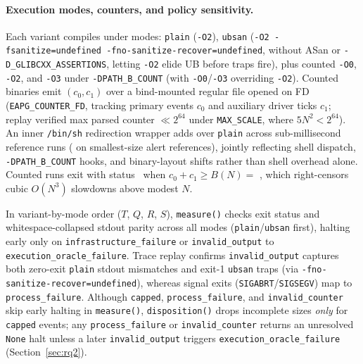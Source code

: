 \documentclass[11pt]{article}
\begin{document}
\paragraph{Execution modes, counters, and policy sensitivity.}
Each variant compiles under \BenchNumModes{} modes: \texttt{plain} (\texttt{-O2}), \texttt{ubsan} (\texttt{-O2 -fsanitize=undefined -fno-sanitize-recover=undefined}, without ASan or \texttt{-D\_GLIBCXX\_ASSERTIONS}, letting \texttt{-O2} elide UB before traps fire), plus counted \texttt{-O0}, \texttt{-O2}, and \texttt{-O3} under \texttt{-DPATH\_B\_COUNT} (with \texttt{-O0}/\texttt{-O3} overriding \texttt{-O2}).
Counted binaries emit $(c_0, c_1)$ over a bind-mounted regular file opened on FD~\BenchFDWire{} (\texttt{EAPG\_COUNTER\_FD}, tracking primary events $c_0$ and auxiliary driver ticks $c_1$; replay verified max parsed counter \BenchMaxCounterVal{} $\ll 2^{64}$ under \texttt{MAX\_SCALE}, where $5N^2 < 2^{64}$).
An inner \texttt{/bin/sh} redirection wrapper adds \BenchFDWrapOverheadMs{} over \texttt{plain} across sub-millisecond reference runs (\BenchOtwoMinusPlainSZeroMs{} on smallest-size alert references), jointly reflecting shell dispatch, \texttt{-DPATH\_B\_COUNT} hooks, and binary-layout shifts rather than shell overhead alone.
Counted runs exit with status~\BenchTickExitCode{} when $c_0+c_1 \ge B(N) =$ \BenchTickCeiling{}, which right-censors cubic $O(N^3)$ slowdowns above modest $N$.

In variant-by-mode order ($T$, $Q$, $R$, $S$), \texttt{measure()} checks exit status and whitespace-collapsed stdout parity across all \BenchNumModes{} modes (\texttt{plain}/\texttt{ubsan} first), halting early only on \texttt{infrastructure\_\allowbreak failure} or \texttt{invalid\_\allowbreak output} to \texttt{execution\_\allowbreak oracle\_\allowbreak failure}.
Trace replay confirms \texttt{invalid\_\allowbreak output} captures both zero-exit \texttt{plain} stdout mismatches and exit-1 \texttt{ubsan} traps (via \texttt{-fno-\allowbreak sanitize-\allowbreak recover=\allowbreak undefined}), whereas signal exits (\texttt{SIGABRT}/\allowbreak\texttt{SIGSEGV}) map to \texttt{process\_\allowbreak failure}.
Although \texttt{capped}, \texttt{process\_\allowbreak failure}, and \texttt{invalid\_\allowbreak counter} skip early halting in \texttt{measure()}, \texttt{disposition()} drops incomplete sizes \emph{only} for \texttt{capped} events; any \texttt{process\_\allowbreak failure} or \texttt{invalid\_\allowbreak counter} returns an unresolved \texttt{None} halt unless a later \texttt{invalid\_\allowbreak output} triggers \texttt{execution\_\allowbreak oracle\_\allowbreak failure} (Section~\ref{sec:rq2}).
\end{document}
